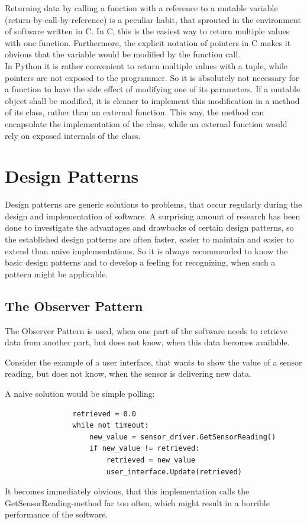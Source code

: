 		Returning data by calling a function with a reference to a mutable variable (return-by-call-by-reference) is a peculiar habit, that sprouted in the environment of software written in C.
		In C, this is the easiest way to return multiple values with one function.
		Furthermore, the explicit notation of pointers in C makes it obvious that the variable would be modified by the function call.\\
		In Python it is rather convenient to return multiple values with a tuple, while pointers are not exposed to the programmer.
		So it is absolutely not necessary for a function to have the side effect of modifying one of its parameters.
		If a mutable object shall be modified, it is cleaner to implement this modification in a method of its class, rather than an external function.
		This way, the method can encapsulate the implementation of the class, while an external function would rely on exposed internals of the class.


	\section{Design Patterns}
		Design patterns are generic solutions to problems, that occur regularly during the design and implementation of software.
		A surprising amount of research has been done to investigate the advantages and drawbacks of certain design patterns, so the established design patterns are often faster, easier to maintain and easier to extend than naive implementations.
		So it is always recommended to know the basic design patterns and to develop a feeling for recognizing, when such a pattern might be applicable.

		\subsection{The Observer Pattern}
			\label{ObserverPattern}
			The Observer Pattern is used, when one part of the software needs to retrieve data from another part, but does not know, when this data becomes available.

			Consider the example of a user interface, that wants to show the value of a sensor reading, but does not know, when the sensor is delivering new data.

			A naive solution would be simple polling:
			\begin{verbatim}
				retrieved = 0.0
				while not timeout:
					new_value = sensor_driver.GetSensorReading()
					if new_value != retrieved:
						retrieved = new_value
						user_interface.Update(retrieved)
			\end{verbatim}
			It becomes immediately obvious, that this implementation calls the GetSensorReading-method far too often, which might result in a horrible performance of the software.

